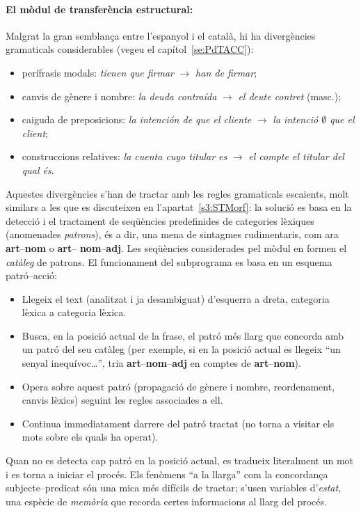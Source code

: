  \paragraph{El mòdul de transferència
   estructural:} 
 Malgrat la gran semblança entre l'espanyol i el català, hi ha
 divergències gramaticals considerables (vegeu el capítol~\ref{se:PdTACC}):
 \begin{itemize}
 \item perífrasis modals: \emph{tienen que firmar}
 $\rightarrow$ \emph{han de firmar}; 
 \item canvis de gènere i nombre: \emph{la deuda
   contraída} $\rightarrow$ \emph{el deute contret} (masc.);
 \item caiguda de preposicions: \emph{la intención de que el cliente} $\rightarrow$ \emph{la
 intenció $\emptyset$ que el client}; 
 \item construccions relatives: \emph{la cuenta cuyo titular es} $\rightarrow$ \emph{el compte el
     titular del qual és}.
 \end{itemize}
 Aquestes divergències s'han de tractar amb les regles gramaticals
 escaients, molt similars a les que es discuteixen en
 l'apartat~\ref{s3:STMorf}: la solució es basa en la detecció i el tractament de
 seqüències predefinides de categories lèxiques (anomenades
 \emph{patrons}), és a dir, una mena de sintagmes rudimentaris, com
 ara {\bf art}--{\bf nom} o {\bf art}--{\bf
   nom}--{\bf adj}. Les seqüències considerades pel mòdul en
 formen el \emph{catàleg} de patrons. El funcionament del subprograma es
 basa en un esquema patró--acció:
 \begin{itemize}
 \item Llegeix el text (analitzat i ja desambiguat) d'esquerra a dreta,
   categoria lèxica a categoria lèxica.
 \item Busca, en la posició actual de la frase, el patró més llarg que
   concorda amb un patró del seu catàleg (per exemple, si en la posició
   actual es llegeix ``un senyal inequívoc\ldots'', tria {\bf
     art}--{\bf nom}--{\bf adj} en comptes de {\bf art}--{\bf nom}).
 \item Opera sobre aquest patró (propagació de gènere i nombre,
   reordenament, canvis lèxics) seguint les regles associades a ell.
 \item Continua immediatament darrere del patró tractat (no torna a
   visitar els mots sobre els quals ha operat).
 \end{itemize}
 Quan no es detecta cap patró en la posició actual, es tradueix
 literalment un mot i es torna a iniciar el procés.  Els fenòmens ``a
 la llarga'' com la concordança subjecte--predicat són una mica més
 difícils de tractar; s'usen variables d'\emph{estat}, una espècie de
 \emph{memòria} que recorda certes informacions al llarg del procés.

